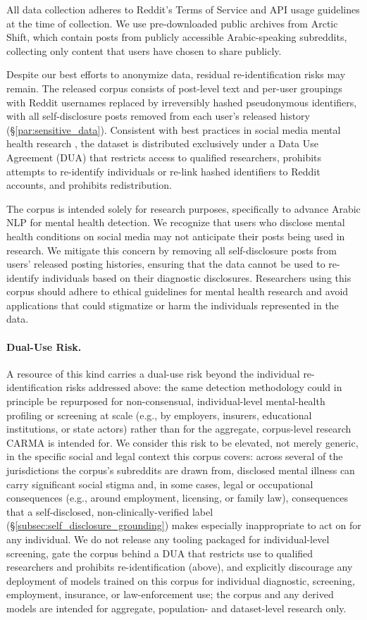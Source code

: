 \documentclass[letterpaper]{article} %
\begin{document}
All data collection adheres to Reddit's Terms of Service and API usage guidelines at the time of collection. We use pre-downloaded public archives from Arctic Shift, which contain posts from publicly accessible Arabic-speaking subreddits, collecting only content that users have chosen to share publicly.

Despite our best efforts to anonymize data, residual re-identification risks may remain. The released corpus consists of post-level text and per-user groupings with Reddit usernames replaced by irreversibly hashed pseudonymous identifiers, with all self-disclosure posts removed from each user's released history (\S\ref{par:sensitive_data}). Consistent with best practices in social media mental health research \cite{harrigian2021state}, the dataset is distributed exclusively under a Data Use Agreement (DUA) that restricts access to qualified researchers, prohibits attempts to re-identify individuals or re-link hashed identifiers to Reddit accounts, and prohibits redistribution.

The corpus is intended solely for research purposes, specifically to advance Arabic NLP for mental health detection. We recognize that users who disclose mental health conditions on social media may not anticipate their posts being used in research. We mitigate this concern by removing all self-disclosure posts from users' released posting histories, ensuring that the data cannot be used to re-identify individuals based on their diagnostic disclosures. Researchers using this corpus should adhere to ethical guidelines for mental health research and avoid applications that could stigmatize or harm the individuals represented in the data.

\paragraph{Dual-Use Risk.} A resource of this kind carries a dual-use risk beyond the individual re-identification risks addressed above: the same detection methodology could in principle be repurposed for non-consensual, individual-level mental-health profiling or screening at scale (e.g., by employers, insurers, educational institutions, or state actors) rather than for the aggregate, corpus-level research CARMA is intended for. We consider this risk to be elevated, not merely generic, in the specific social and legal context this corpus covers: across several of the jurisdictions the corpus's subreddits are drawn from, disclosed mental illness can carry significant social stigma and, in some cases, legal or occupational consequences (e.g., around employment, licensing, or family law), consequences that a self-disclosed, non-clinically-verified label (\S\ref{subsec:self_disclosure_grounding}) makes especially inappropriate to act on for any individual. We do not release any tooling packaged for individual-level screening, gate the corpus behind a DUA that restricts use to qualified researchers and prohibits re-identification (above), and explicitly discourage any deployment of models trained on this corpus for individual diagnostic, screening, employment, insurance, or law-enforcement use; the corpus and any derived models are intended for aggregate, population- and dataset-level research only.
\end{document}
